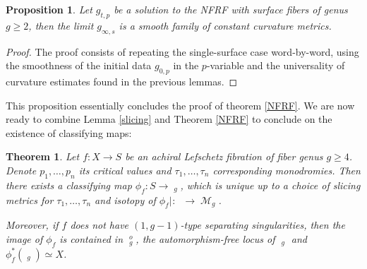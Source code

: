 \documentclass{article}
\DeclareMathOperator{\dm}{\overline{\mathcal{M}}}
\DeclareMathOperator{\m}{\mathcal{M}}
\DeclareMathOperator{\scr}{\overline{\mathcal{C}}}
\DeclareMathOperator{\sreg}{S_{\text{reg.}}}
\theoremstyle{plain}
\newtheorem{prop}{Proposition}[section]
\newtheorem{thm}{Theorem}[section]
\theoremstyle{remark}
\theoremstyle{definition}
\begin{document}
\begin{prop}
    Let $g_{t,p}$ be a solution to the NFRF with surface fibers of genus $g\geq 2$, then the limit $g_{\infty, s}$ is a smooth family of constant curvature metrics.
\end{prop}
\begin{proof}
    The proof consists of repeating the single-surface case word-by-word, using the smoothness of the initial data $g_{0,p}$ in the $p$-variable and the universality of curvature estimates found in the previous lemmas.
\end{proof} 
This proposition essentially concludes the proof of theorem \ref{NFRF}. We are now ready to combine Lemma \ref{slicing} and Theorem \ref{NFRF} to conclude on the existence of classifying maps\thinspace:
\begin{thm}\label{thm:main1}
    Let $f:X\to S$ be an achiral Lefschetz fibration of fiber genus $g\geq 4$. Denote $p_1,\dots,p_n$ its critical values and $\tau_1,\dots,\tau_n$ corresponding monodromies. Then there exists a classifying map $\phi_f: S\to \dm_g$, which is unique up to a choice of slicing metrics for $\tau_1,\dots,\tau_n$ and isotopy of $\phi_f|_{\sreg}: \sreg\to \m_g$. \par 
    Moreover, if $f$ does not have $(1,g-1)$-type separating singularities, then the image of $\phi_f$ is contained in $\dm_g^o$, the automorphism-free locus of $\dm_g$ and $\phi_f^*(\scr_g) \simeq X$.
\end{thm}
\end{document}

